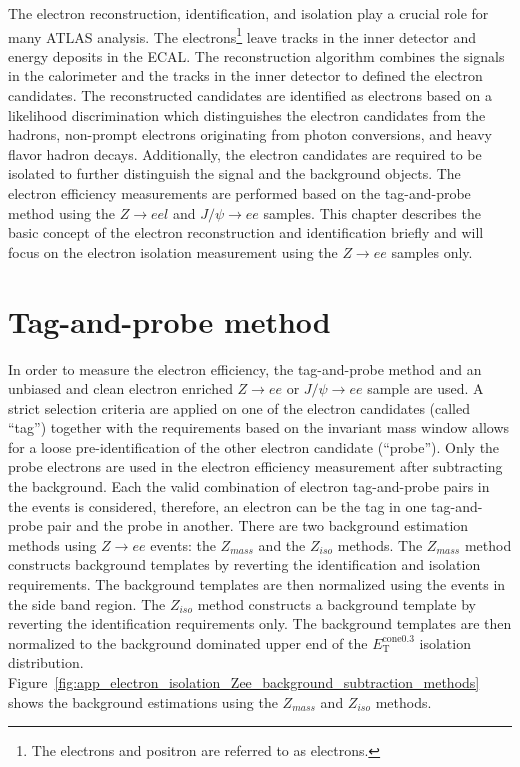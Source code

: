 The electron reconstruction, identification, and isolation play a crucial role for many ATLAS analysis.
The electrons\footnote{The electrons and positron are referred to as electrons.} leave tracks in the inner detector and energy deposits in the ECAL.
The reconstruction algorithm combines the signals in the calorimeter and the tracks in the inner detector to defined the electron candidates.
The reconstructed candidates are identified as electrons based on a likelihood discrimination which distinguishes the electron candidates from the hadrons, non-prompt electrons originating from photon conversions, and heavy flavor hadron decays.
Additionally, the electron candidates are required to be isolated to further distinguish the signal and the background objects.
The electron efficiency measurements are performed based on the tag-and-probe method using the $Z \to eel$ and $J/\psi \to ee$ samples.
This chapter describes the basic concept of the electron reconstruction and identification briefly and will focus on the electron isolation measurement using the $Z \to ee$ samples only.


\section{Tag-and-probe method}
\label{sec:app_tag_and_probe_method}
In order to measure the electron efficiency, the tag-and-probe method and an unbiased and clean electron enriched $Z \to ee$ or $J/\psi \to ee$ sample are used.
A strict selection criteria are applied on one of the electron candidates (called ``tag'') together with the requirements based on the invariant mass window allows for a loose pre-identification of the other electron candidate (``probe'').
Only the probe electrons are used in the electron efficiency measurement after subtracting the background.
Each the valid combination of electron tag-and-probe pairs in the events is considered, therefore, an electron can be the tag in one tag-and-probe pair and the probe in another.
There are two background estimation methods using $Z \to ee$ events: the $Z_{mass}$ and the $Z_{iso}$ methods.
The $Z_{mass}$ method constructs background templates by reverting the identification and isolation requirements.
The background templates are then normalized using the events in the side band region.
The $Z_{iso}$ method constructs a background template by reverting the identification requirements only.
The background templates are then normalized to the background dominated upper end of the $E_\mathrm{T}^\mathrm{cone0.3}$ isolation distribution.
Figure~\ref{fig:app_electron_isolation_Zee_background_subtraction_methods} shows the background estimations using the $Z_{mass}$ and $Z_{iso}$ methods.

